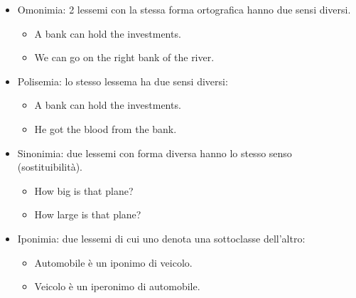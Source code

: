 \begin{itemize}
  \item Omonimia: 2 lessemi con la stessa forma ortografica hanno due sensi diversi.
    \begin{itemize}
      \item A bank can hold the investments. 
      \item We can go on the right bank of the river.
    \end{itemize}
  \item Polisemia: lo stesso lessema ha due sensi diversi:
    \begin{itemize}
      \item A bank can hold the investments. 
      \item He got the blood from the bank.
    \end{itemize}
  \item Sinonimia: due lessemi con forma diversa hanno lo stesso senso (sostituibilità). 
    \begin{itemize}
      \item How big is that plane?
      \item How large is that plane?
    \end{itemize}
  \item Iponimia: due lessemi di cui uno denota una sottoclasse dell'altro: 
    \begin{itemize}
      \item Automobile è un iponimo di veicolo. 
      \item Veicolo è un iperonimo di automobile.
    \end{itemize}
\end{itemize}





